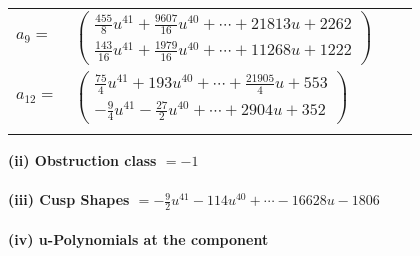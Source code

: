 \documentclass[1p]{elsarticle_modified}
\theoremstyle{definition}
\begin{document}
\begin{tabular}{m{7pt} m{180pt} m{7pt} m{180pt} }
\flushright $a_{9}=$&$\begin{pmatrix}\frac{455}{8} u^{41}+\frac{9607}{16} u^{40}+\cdots+21813 u+2262\\\frac{143}{16} u^{41}+\frac{1979}{16} u^{40}+\cdots+11268 u+1222\end{pmatrix}$ \\
\flushright $a_{12}=$&$\begin{pmatrix}\frac{75}{4} u^{41}+193 u^{40}+\cdots+\frac{21905}{4} u+553\\-\frac{9}{4} u^{41}-\frac{27}{2} u^{40}+\cdots+2904 u+352\end{pmatrix}$\\&\end{tabular}
\flushleft \textbf{(ii) Obstruction class $= -1$}\\~\\
\flushleft \textbf{(iii) Cusp Shapes $= -\frac{9}{2} u^{41}-114 u^{40}+\cdots-16628 u-1806$}\\~\\
\newpage\renewcommand{\arraystretch}{1}
\flushleft \textbf{(iv) u-Polynomials at the component}\newline \\
\end{document}
